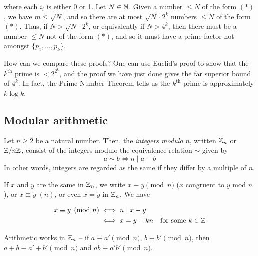 \documentclass{../../template/note}
\begin{document}
\begin{enumerate}[label=\protect\circled{\arabic*}]
        where each \(i_i\) is either 0 or 1. Let \(N \in \mathbb N\). Given a number \(\leq N\) of the form \((*)\), we have \(m \leq \sqrt N\), and so there are at most \(\sqrt N \cdot 2^k\) numbers \(\leq N\) of the form \((*)\). Thus, if \(N > \sqrt N \cdot 2^k\), or equivalently if \(N > 4^k\), then there must be a number \(\leq N\) not of the form \((*)\), and so it must have a prime factor not amongst \(\{p_1, \dots, p_k\}\).

        How can we compare these proofs? One can use Euclid's proof to show that the \(k^\text{th}\) prime is \(< 2^{2^k}\), and the proof we have just done gives the far superior bound of \(4^k\). In fact, the Prime Number Theorem tells us the \(k^\text{th}\) prime is approximately \(k \log k\).
    \end{enumerate}
    
    \subsection{Modular arithmetic}

    \begin{definition}
        Let \(n \geq 2\) be a natural number. Then, the \emph{integers modulo \(n\)}, written \(\mathbb Z_n\) or \(\mathbb Z/n\mathbb Z\), consist of the integers modulo the equivalence relation \(\sim\) given by
        \[
            a \sim b \iff n \mid a-b
        \]
        In other words, integers are regarded as the same if they differ by a multiple of \(n\).
    \end{definition}
    If \(x\) and \(y\) are the same in \(\mathbb Z_n\), we write \(x \equiv y \pmod n\) (\(x\) congruent to \(y\) mod \(n\)), or \(x \equiv y \; (n)\), or even \(x = y\) in \(\mathbb Z_n\). We have

    \begin{align*}
        x \equiv y \pmod n &\iff n \mid x - y \\
        &\iff x = y + kn \quad \text{for some } k \in \mathbb Z
    \end{align*}
    
    \begin{proposition}
        Arithmetic works in \(\mathbb Z_n\) -- if \(a \equiv a' \pmod n\), \(b \equiv b' \pmod n\), then \(a + b \equiv a' + b' \pmod n\) and \(ab \equiv a'b' \pmod n\).
    \end{proposition}
    
\end{document}
